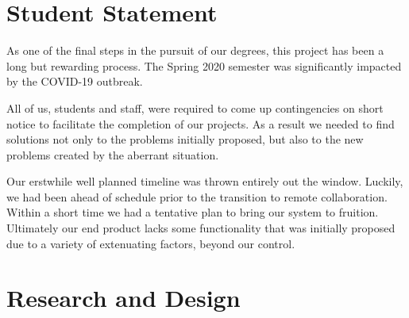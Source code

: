 \documentclass[a4paper,11pt]{report}
\begin{document}
	\section{Student Statement}
	As one of the final steps in the pursuit of our degrees, this project has been a long but rewarding process. The Spring 2020 semester was significantly impacted by the COVID-19 outbreak. 
	\par All of us, students and staff, were required to come up contingencies on short notice to facilitate the completion of our projects. As a result we needed to find solutions not only to the problems initially proposed, but also to the new problems created by the aberrant situation. 
	\par Our erstwhile well planned timeline was thrown entirely out the window. Luckily, we had been ahead of schedule prior to the transition to remote collaboration. Within a short time we had a tentative plan to bring our system to fruition. Ultimately our end product lacks some functionality that was initially proposed due to a variety of extenuating factors, beyond our control. 
	
	\tableofcontents
	\listoffigures
	
	\section{Research and Design}
\end{document}
